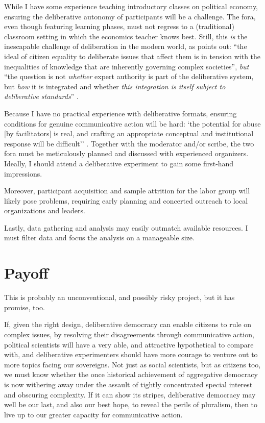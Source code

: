 While I have some experience teaching introductory classes on political economy, ensuring the deliberative autonomy of participants will be a challenge.
The fora, even though featuring learning phases, must not regress to a (traditional) classroom setting in which the economics teacher knows best.
Still, this \emph{is} the inescapable challenge of deliberation in the modern world, as \citeauthor{Moore2011} points out: 
``the ideal of citizen equality to deliberate issues that affect them is in tension with the inequalities of knowledge that are inherently governing complex societies'', \emph{but} ``the question is not \emph{whether} expert authority is part of the deliberative system, but \emph{how} it is integrated and whether \emph{this integration is itself subject to deliberative standards}'' \cite[14][emphasis added]{Moore2011}.

Because I have no practical experience with deliberative formats, ensuring conditions for genuine communicative action will be hard: `the potential for abuse [by facilitators] is real, and crafting an appropriate conceptual and institutional response will be difficult'' \citep[25]{GutmannThompson-2004-aa}.
Together with the moderator and/or scribe, the two fora must be meticulously planned and discussed with experienced organizers.
Ideally, I should attend a deliberative experiment to gain some first-hand impressions.

Moreover, participant acquisition and sample attrition for the labor group will likely pose problems, requiring early planning and concerted outreach to local organizations and leaders.

Lastly, data gathering and analysis may easily outmatch available resources.
I must filter data and focus the analysis on a manageable size.

\section{Payoff}
This is probably an unconventional, and possibly risky project, but it has promise, too.

If, given the right design, deliberative democracy can enable citizens to rule on complex issues, by resolving their disagreements through communicative action, political scientists will have a very able, and attractive hypothetical to compare with, and deliberative experimenters should have more courage to venture out to more topics facing our sovereigns.
Not just as social scientists, but as citizens too, we must know whether the once historical achievement of aggregative democracy is now withering away under the assault of tightly concentrated special interest and obscuring complexity.
If it can show its stripes, deliberative democracy may well be our last, and also our best hope, to reveal the perils of pluralism, then to live up to our greater capacity for communicative action.

